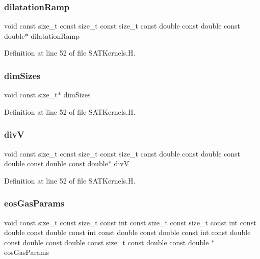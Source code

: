 \subsubsection{\texorpdfstring{dilatation\+Ramp}{dilatationRamp}}
{\footnotesize\ttfamily void const size\+\_\+t const size\+\_\+t const size\+\_\+t const double const double const double$\ast$ dilatation\+Ramp}



Definition at line 52 of file S\+A\+T\+Kernels.\+H.

\hypertarget{SATKernels_8H_a338d2e6b5802f9ba652d355df0b1a04b}{}\label{SATKernels_8H_a338d2e6b5802f9ba652d355df0b1a04b} 
\subsubsection{\texorpdfstring{dim\+Sizes}{dimSizes}}
{\footnotesize\ttfamily void const size\+\_\+t$\ast$ dim\+Sizes}



Definition at line 52 of file S\+A\+T\+Kernels.\+H.

\hypertarget{SATKernels_8H_a7e17251bb9d4e0676024410ca03462c7}{}\label{SATKernels_8H_a7e17251bb9d4e0676024410ca03462c7} 
\subsubsection{\texorpdfstring{divV}{divV}}
{\footnotesize\ttfamily void const size\+\_\+t const size\+\_\+t const size\+\_\+t const double const double const double const double const double$\ast$ divV}



Definition at line 52 of file S\+A\+T\+Kernels.\+H.

\hypertarget{SATKernels_8H_ac8bfd00975838fc342c281f3fd053090}{}\label{SATKernels_8H_ac8bfd00975838fc342c281f3fd053090} 
\subsubsection{\texorpdfstring{eos\+Gas\+Params}{eosGasParams}}
{\footnotesize\ttfamily void const size\+\_\+t const size\+\_\+t const int const size\+\_\+t const size\+\_\+t const int const double const double const int const double const double const int const double const double const double const size\+\_\+t const double const double $\ast$ eos\+Gas\+Params}



